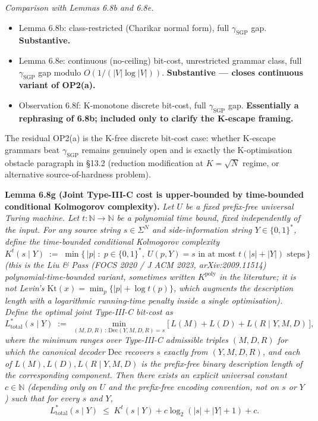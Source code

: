 \documentclass[
]{article}
\begin{document}
\emph{Comparison with Lemmas 6.8b and 6.8e.}
\begin{itemize}
\item Lemma 6.8b: class-restricted (Charikar normal form), full
$\gamma_{\mathrm{SGP}}$ gap. \textbf{Substantive.}
\item Lemma 6.8e: continuous (no-ceiling) bit-cost, unrestricted grammar
class, full $\gamma_{\mathrm{SGP}}$ gap modulo $O(1/(|V|\log|V|))$.
\textbf{Substantive --- closes continuous variant of OP2(a).}
\item Observation 6.8f: K-monotone discrete bit-cost, full
$\gamma_{\mathrm{SGP}}$ gap. \textbf{Essentially a rephrasing of
6.8b; included only to clarify the K-escape framing.}
\end{itemize}
The residual OP2(a) is the K-free discrete bit-cost case: whether
K-escape grammars beat $\gamma_{\mathrm{SGP}}$ remains genuinely
open and is exactly the K-optimisation obstacle paragraph in §13.2
(reduction modification at $K = \sqrt{N}$ regime, or alternative
source-of-hardness problem).

\textbf{Lemma 6.8g (Joint Type-III-C cost is upper-bounded by
time-bounded conditional Kolmogorov complexity).} \emph{Let
$U$ be a fixed prefix-free universal Turing machine. Let
$t : \mathbb{N} \to \mathbb{N}$ be a polynomial time bound,
fixed independently of the input. For any source string
$s \in \Sigma^N$ and side-information string $Y \in \{0,1\}^*$,
define the time-bounded conditional Kolmogorov complexity
\[
  K^t(s \mid Y) \;:=\; \min\bigl\{\,|p|
  \;:\; p \in \{0,1\}^*,\ U(p, Y) = s \text{ in at most } t(|s|+|Y|)
  \text{ steps}\,\bigr\}
\]
(this is the Liu \& Pass (FOCS 2020 / J ACM 2023, arXiv:2009.11514)
polynomial-time-bounded variant, sometimes written $K^{\mathrm{poly}}$
in the literature; it is \emph{not} Levin's $\mathrm{Kt}(x) =
\min_p\{|p| + \log t(p)\}$, which augments the description length
with a logarithmic running-time penalty inside a single
optimisation). Define the
optimal joint Type-III-C bit-cost as
\[
  L^*_{\mathrm{total}}(s \mid Y) \;:=\;
  \min_{(M,D,R)\,:\,\mathrm{Dec}(Y,M,D,R)=s}
  \bigl[\, L(M) + L(D) + L(R \mid Y, M, D)\,\bigr],
\]
where the minimum ranges over Type-III-C admissible triples
$(M, D, R)$ for which the canonical decoder $\mathrm{Dec}$ recovers
$s$ exactly from $(Y, M, D, R)$, and each of $L(M), L(D),
L(R \mid Y, M, D)$ is the prefix-free binary description length of
the corresponding component. Then there exists an explicit universal
constant $c \in \mathbb{N}$ (depending only on $U$ and the
prefix-free encoding convention, not on $s$ or $Y$) such that for
every $s$ and $Y$,
\[
  L^*_{\mathrm{total}}(s \mid Y) \;\leq\; K^t(s \mid Y) + c\log_2(|s|+|Y|+1) + c.
\]
}
\end{document}
